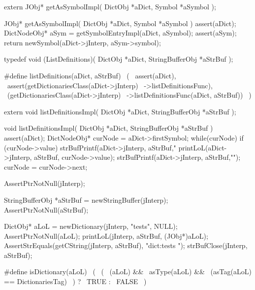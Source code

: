 \startCHeader
extern JObj* getAsSymbolImpl(
  DictObj *aDict,
  Symbol  *aSymbol
);
\stopCHeader
{}

\startCCode
JObj* getAsSymbolImpl(
  DictObj *aDict,
  Symbol  *aSymbol
) {
  assert(aDict);
  DictNodeObj* aSym = getSymbolEntryImpl(aDict, aSymbol);
  assert(aSym);
  return newSymbol(aDict->jInterp, aSym->symbol);
}
\stopCCode
\stopTestSuite

\startTestSuite[listDefinitions]

\startCHeader
typedef void (ListDefinitions)(
  DictObj         *aDict,
  StringBufferObj *aStrBuf
);

#define listDefinitions(aDict, aStrBuf)         \
  (                                             \
    assert(aDict),                              \
    assert(getDictionariesClass(aDict->jInterp) \
      ->listDefinitionsFunc),                   \
    (getDictionariesClass(aDict->jInterp)       \
      ->listDefinitionsFunc(aDict, aStrBuf))    \
  )
\stopCHeader

\setCHeaderStream{private}
\startCHeader
extern void listDefinitionsImpl(
  DictObj         *aDict,
  StringBufferObj *aStrBuf
);
\stopCHeader
\setCHeaderStream{public}

\startCCode
void listDefinitionsImpl(
  DictObj         *aDict,
  StringBufferObj *aStrBuf
) {
  assert(aDict);
  DictNodeObj* curNode = aDict->firstSymbol;
  while(curNode) {
    if (curNode->value) {
      strBufPrintf(aDict->jInterp, aStrBuf,"%
      printLoL(aDict->jInterp, aStrBuf, curNode->value);
      strBufPrintf(aDict->jInterp, aStrBuf,"\n");
    }
    curNode = curNode->next;
  }
}
\stopCCode

\startTestCase[print Dictionary]
\startCTest
  AssertPtrNotNull(jInterp);

  StringBufferObj *aStrBuf = newStringBuffer(jInterp);
  AssertPtrNotNull(aStrBuf);

  DictObj* aLoL = newDictionary(jInterp, "tests", NULL);
  AssertPtrNotNull(aLoL);
  printLoL(jInterp, aStrBuf, (JObj*)aLoL);
  AssertStrEquals(getCString(jInterp, aStrBuf), "dict:tests ");
  strBufClose(jInterp, aStrBuf);
\stopCTest
\stopTestCase
\stopTestSuite

\startTestSuite[isDictionary]
\startCHeader
#define isDictionary(aLoL)              \
  (                                     \
    (                                   \
      (aLoL) &&                         \
      asType(aLoL) &&                   \
      (asTag(aLoL) == DictionariesTag)  \
    ) ?                                 \
      TRUE :                            \
      FALSE                             \
  )
\stopCHeader
\stopTestSuite

